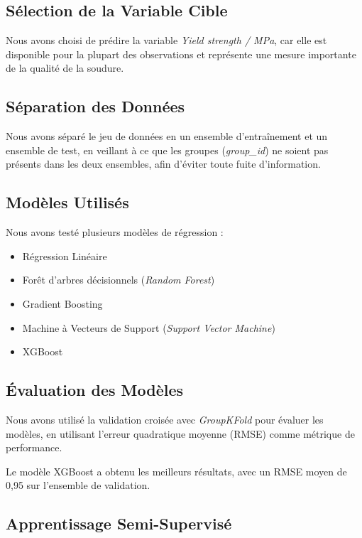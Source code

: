 \documentclass{article}
\begin{document}
\subsection{Sélection de la Variable Cible}

Nous avons choisi de prédire la variable \textit{Yield strength / MPa}, car elle est disponible pour la plupart des observations et représente une mesure importante de la qualité de la soudure.

\subsection{Séparation des Données}

Nous avons séparé le jeu de données en un ensemble d'entraînement et un ensemble de test, en veillant à ce que les groupes (\textit{group\_id}) ne soient pas présents dans les deux ensembles, afin d'éviter toute fuite d'information.

\subsection{Modèles Utilisés}

Nous avons testé plusieurs modèles de régression :

\begin{itemize}
    \item Régression Linéaire
    \item Forêt d'arbres décisionnels (\textit{Random Forest})
    \item Gradient Boosting
    \item Machine à Vecteurs de Support (\textit{Support Vector Machine})
    \item XGBoost
\end{itemize}

\subsection{Évaluation des Modèles}

Nous avons utilisé la validation croisée avec \textit{GroupKFold} pour évaluer les modèles, en utilisant l'erreur quadratique moyenne (RMSE) comme métrique de performance.

Le modèle XGBoost a obtenu les meilleurs résultats, avec un RMSE moyen de 0,95 sur l'ensemble de validation.

\subsection{Apprentissage Semi-Supervisé}
\end{document}
